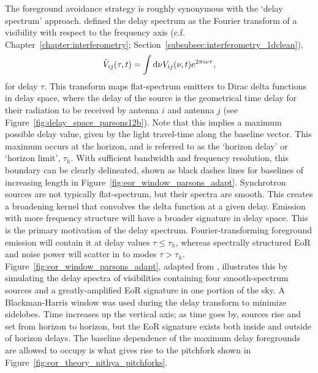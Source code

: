 The foreground avoidance strategy is roughly synonymous with the `delay spectrum' approach. \cite{ParsonsBacker.09} defined the delay spectrum as the Fourier transform of a visibility with respect to the frequency axis (c.f. Chapter~\ref{chapter:interferometry}; Section~\ref{subsubsec:interferometry_1dclean}),
\begin{equation}
\tilde{V}_{ij}(\tau,t) = \int {\rm d}\nu V_{ij}(\nu,t)e^{2\pi i \nu \tau},
\end{equation}
for delay $\tau$. This transform maps flat-spectrum emitters to Dirac delta functions in delay space, where the delay of the source is the geometrical time delay for their radiation to be received by antenna $i$ and antenna $j$ (see Figure~\ref{fig:delay_space_parsons12b}). Note that this implies a maximum possible delay value, given by the light travel-time along the baseline vector. This maximum occurs at the horizon, and is referred to as the `horizon delay' or `horizon limit', $\tau_h$. With sufficient bandwidth and frequency resolution, this boundary can be clearly delineated, shown as black dashes lines for baselines of increasing length in Figure~\ref{fig:eor_window_parsons_adapt}. Synchrotron sources are not typically flat-spectrum, but their spectra are smooth. This creates a broadening kernel that convolves the delta function at a given delay. Emission with more frequency structure will have a broader signature in delay space. This is the primary motivation of the delay spectrum. Fourier-transforming foreground emission will contain it at delay values $\tau \leq \tau_h$, whereas spectrally structured EoR and noise power will scatter in to modes $\tau > \tau_h$. Figure~\ref{fig:eor_window_parsons_adapt}, adapted from \cite{Parsons.12a}, illustrates this by simulating the delay spectra of visibilities containing four smooth-spectrum sources and a greatly-amplified EoR signature in one portion of the sky. A Blackman-Harris window was used during the delay transform to minimize sidelobes. Time increases up the vertical axis; as time goes by, sources rise and set from horizon to horizon, but the EoR signature exists both inside and outside of horizon delays. The baseline dependence of the maximum delay foregrounds are allowed to occupy is what gives rise to the pitchfork shown in Figure~\ref{fig:eor_theory_nithya_pitchforks}.

